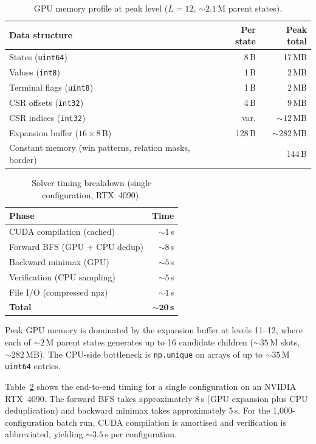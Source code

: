 \documentclass[11pt,a4paper]{article}
\begin{document}
\begin{table}[t]
\centering
\caption{GPU memory profile at peak level ($L{=}12$, ${\sim}2.1$\,M parent states).}
\label{tab:cuda}
\begin{tabular}{@{}lrr@{}}
\toprule
Data structure & Per state & Peak total\\
\midrule
States (\texttt{uint64})           & 8\,B   & 17\,MB\\
Values (\texttt{int8})             & 1\,B   & 2\,MB\\
Terminal flags (\texttt{uint8})    & 1\,B   & 2\,MB\\
CSR offsets (\texttt{int32})       & 4\,B   & 9\,MB\\
CSR indices (\texttt{int32})       & var.   & ${\sim}12$\,MB\\
Expansion buffer ($16{\times}8$\,B)& 128\,B & ${\sim}282$\,MB\\
\midrule
Constant memory (win patterns, relation masks, border) & \multicolumn{2}{r}{144\,B}\\
\bottomrule
\end{tabular}
\end{table}

\begin{table}[t]
\centering
\caption{Solver timing breakdown (single configuration, RTX~4090).}
\label{tab:perf}
\begin{tabular}{@{}lr@{}}
\toprule
Phase & Time\\
\midrule
CUDA compilation (cached)     & ${\sim}1$\,s\\
Forward BFS (GPU + CPU dedup) & ${\sim}8$\,s\\
Backward minimax (GPU)        & ${\sim}5$\,s\\
Verification (CPU sampling)   & ${\sim}5$\,s\\
File I/O (compressed npz)     & ${\sim}1$\,s\\
\midrule
\textbf{Total}                & $\mathbf{{\sim}20}$\,\textbf{s}\\
\bottomrule
\end{tabular}
\end{table}

Peak GPU memory is dominated by the expansion buffer at levels 11--12, where
each of ${\sim}2$\,M parent states generates up to 16 candidate children
(${\sim}35$\,M slots, ${\sim}282$\,MB).  The CPU-side bottleneck is
\texttt{np.unique} on arrays of up to ${\sim}35$\,M \texttt{uint64} entries.

Table~\ref{tab:perf} shows the end-to-end timing for a single configuration
on an NVIDIA RTX~4090.  The forward BFS takes approximately 8\,s (GPU
expansion plus CPU deduplication) and backward minimax takes approximately
5\,s.  For the 1{,}000-configuration batch run, CUDA compilation is
amortised and verification is abbreviated, yielding ${\sim}3.5$\,s per
configuration.
\end{document}
